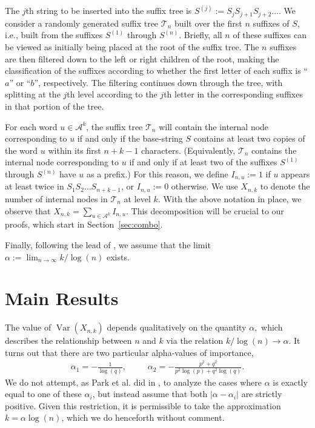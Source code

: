 \documentclass[proceedings]{aofa}
\def\Var{\mathop{\operatorname{Var}}}
\newcommand{\Iu}{I_{n,u}}
\newcommand{\sumu}{\sum_{u\in\Ak}}
\newcommand{\Ak}{\mathcal{A}^{k}}
\begin{document}
The $j$th string to be inserted into the suffix tree is
$S^{(j)} := S_{j}S_{j+1}S_{j+2}\ldots$.  We consider a randomly
generated suffix tree
$\mathcal{T}_{n}$ built over the first $n$ suffixes of $S$, i.e.,
built from the suffixes $S^{(1)}$ through $S^{(n)}$.
Briefly, all $n$ of these suffixes can be viewed as initially being
placed at the root of the suffix tree.  The $n$ suffixes are then
filtered down to the left or right children of the root, making the
classification of the suffixes according to whether the first letter
of each suffix is ``$a$'' or ``$b$'', respectively.  The filtering
continues down through the tree, with splitting at the $j$th level
according to the $j$th letter in the corresponding suffixes in that
portion of the tree.

For each word $u \in \Ak$, the suffix tree $\mathcal{T}_{n}$ will
contain the internal node corresponding to $u$ if and only if the base-string
$S$ contains at least two copies of the word $u$ within its first $n+k-1$
characters.  (Equivalently, $\mathcal{T}_{n}$ 
contains the internal node corresponding to $u$ if and only if at
least two of the suffixes $S^{(1)}$ through $S^{(n)}$ have $u$ as a prefix.)
For this reason, we define
$I_{n,u}:= 1$
if $u$ appears at least twice in $S_{1}S_{2}\ldots S_{n+k-1}$, 
or $I_{n,u}:= 0$ otherwise.
We use $X_{n,k}$ to denote the number of internal nodes in
$\mathcal{T}_{n}$ at level $k$.
With the above notation in place, we observe that 
$X_{n,k}=\sumu \Iu$.  This decomposition will be crucial to our
proofs, which start in Section~\ref{sec:combo}.

Finally, following the lead of \cite{Park:2009}, we assume that the limit $\alpha := \lim_{n \rightarrow \infty}k/\log(n)$ exists.

\section{Main Results}\label{intro}
The value of $\Var(X_{n,k})$ depends qualitatively on the quantity $\alpha,$ which describes the relationship between $n$ and $k$ via the relation $k/\log(n) \rightarrow \alpha$. It turns out that there are two particular alpha-values of importance,
\begin{align*}
\alpha_{1}=-\frac{1}{\log(q)},\hspace{30pt} \alpha_{2}=-\frac{p^{2}+q^{2}}{p^{2}\log(p)+q^{2}\log(q)}.
\end{align*}
We do not attempt, as Park et al. did in \cite{Park:2009}, to analyze
the cases where $\alpha$ is exactly equal to one of these
$\alpha_{i}$, but instead assume that both $|\alpha-\alpha_{i}|$ are
strictly positive. Given this restriction, it is permissible to take the approximation $k=\alpha\log(n)$, which we do henceforth without comment.
\end{document}
